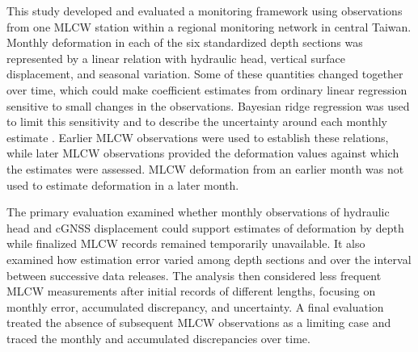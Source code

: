 This study developed and evaluated a monitoring framework using observations from one MLCW station within a regional monitoring network in central Taiwan. %
Monthly deformation in each of the six standardized depth sections was represented by a linear relation with hydraulic head, vertical surface displacement, and seasonal variation. %
Some of these quantities changed together over time, which could make coefficient estimates from ordinary linear regression sensitive to small changes in the observations. Bayesian ridge regression was used to limit this sensitivity and to describe the uncertainty around each monthly estimate \citep{hoerl_1970_ridge,mackay_bayesian_1992}. Earlier MLCW observations were used to establish these relations, while later MLCW observations provided the deformation values against which the estimates were assessed. MLCW deformation from an earlier month was not used to estimate deformation in a later month. %


The primary evaluation examined whether monthly observations of hydraulic head and cGNSS displacement could support estimates of deformation by depth while finalized MLCW records remained temporarily unavailable. It also examined how estimation error varied among depth sections and over the interval between successive data releases. The analysis then considered less frequent MLCW measurements after initial records of different lengths, focusing on monthly error, accumulated discrepancy, and uncertainty. A final evaluation treated the absence of subsequent MLCW observations as a limiting case and traced the monthly and accumulated discrepancies over time.

